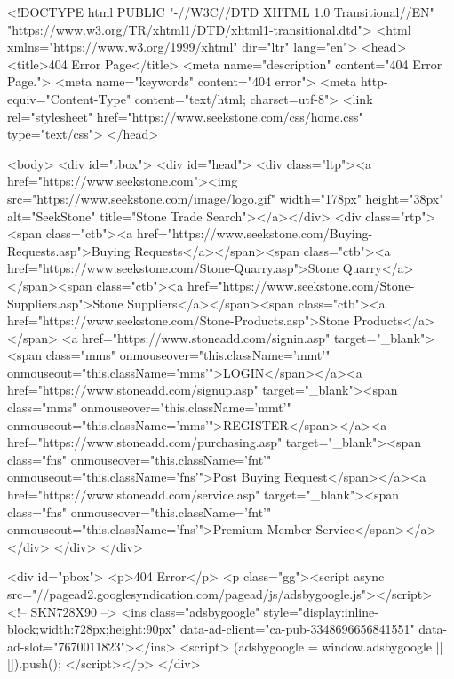 ﻿<!DOCTYPE html PUBLIC "-//W3C//DTD XHTML 1.0 Transitional//EN" "https://www.w3.org/TR/xhtml1/DTD/xhtml1-transitional.dtd">
<html xmlns="https://www.w3.org/1999/xhtml" dir="ltr" lang="en">
<head>
<title>404 Error Page</title>
<meta name="description" content="404 Error Page.">
<meta name="keywords" content="404 error">
<meta http-equiv="Content-Type" content="text/html; charset=utf-8">
<link rel="stylesheet" href="https://www.seekstone.com/css/home.css" type="text/css">
</head>

<body>
<div id="tbox">
<div id="head">
<div class="ltp"><a href="https://www.seekstone.com"><img src="https://www.seekstone.com/image/logo.gif" width="178px" height="38px" alt="SeekStone" title="Stone Trade Search"></a></div> 
<div class="rtp"><span class="ctb"><a href="https://www.seekstone.com/Buying-Requests.asp">Buying Requests</a></span><span class="ctb"><a href="https://www.seekstone.com/Stone-Quarry.asp">Stone Quarry</a></span><span class="ctb"><a href="https://www.seekstone.com/Stone-Suppliers.asp">Stone Suppliers</a></span><span class="ctb"><a href="https://www.seekstone.com/Stone-Products.asp">Stone Products</a></span>
<a href="https://www.stoneadd.com/signin.asp" target="_blank"><span class="mms" onmouseover="this.className='mmt'" onmouseout="this.className='mms'">LOGIN</span></a><a href="https://www.stoneadd.com/signup.asp" target="_blank"><span class="mms" onmouseover="this.className='mmt'" onmouseout="this.className='mms'">REGISTER</span></a><a href="https://www.stoneadd.com/purchasing.asp" target="_blank"><span class="fns" onmouseover="this.className='fnt'" onmouseout="this.className='fns'">Post Buying Request</span></a><a href="https://www.stoneadd.com/service.asp" target="_blank"><span class="fns" onmouseover="this.className='fnt'" onmouseout="this.className='fns'">Premium Member Service</span></a></div>
</div>
</div>

<div id="pbox">
<p>404 Error</p>
<p class="gg"><script async src="//pagead2.googlesyndication.com/pagead/js/adsbygoogle.js"></script>
<!-- SKN728X90 -->
<ins class="adsbygoogle"
     style="display:inline-block;width:728px;height:90px"
     data-ad-client="ca-pub-3348696656841551"
     data-ad-slot="7670011823"></ins>
<script>
(adsbygoogle = window.adsbygoogle || []).push({});
</script></p>
</div>

